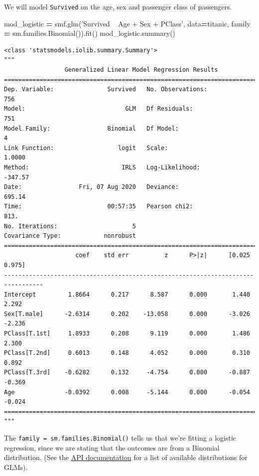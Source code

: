 \documentclass[
  letterpaper,
]{scrbook}
\newenvironment{Shaded}{\begin{snugshade}}{\end{snugshade}}
\newcommand{\NormalTok}[1]{#1}
\newcommand{\OperatorTok}[1]{\textcolor[rgb]{0.81,0.36,0.00}{\textbf{#1}}}
\newcommand{\StringTok}[1]{\textcolor[rgb]{0.31,0.60,0.02}{#1}}
\begin{document}
We will model \texttt{Survived} on the age, sex and passenger class of passengers.

\begin{Shaded}
\begin{Highlighting}[]
\NormalTok{mod_logistic }\OperatorTok{=}\NormalTok{ smf.glm(}\StringTok{'Survived ~ Age + Sex + PClass'}\NormalTok{, data}\OperatorTok{=}\NormalTok{titanic,}
\NormalTok{  family }\OperatorTok{=}\NormalTok{ sm.families.Binomial()).fit()}
\NormalTok{mod_logistic.summary()}
\end{Highlighting}
\end{Shaded}

\begin{verbatim}
<class 'statsmodels.iolib.summary.Summary'>
"""
                 Generalized Linear Model Regression Results                  
==============================================================================
Dep. Variable:               Survived   No. Observations:                  756
Model:                            GLM   Df Residuals:                      751
Model Family:                Binomial   Df Model:                            4
Link Function:                  logit   Scale:                          1.0000
Method:                          IRLS   Log-Likelihood:                -347.57
Date:                Fri, 07 Aug 2020   Deviance:                       695.14
Time:                        00:57:35   Pearson chi2:                     813.
No. Iterations:                     5                                         
Covariance Type:            nonrobust                                         
=================================================================================
                    coef    std err          z      P>|z|      [0.025      0.975]
---------------------------------------------------------------------------------
Intercept         1.8664      0.217      8.587      0.000       1.440       2.292
Sex[T.male]      -2.6314      0.202    -13.058      0.000      -3.026      -2.236
PClass[T.1st]     1.8933      0.208      9.119      0.000       1.486       2.300
PClass[T.2nd]     0.6013      0.148      4.052      0.000       0.310       0.892
PClass[T.3rd]    -0.6282      0.132     -4.754      0.000      -0.887      -0.369
Age              -0.0392      0.008     -5.144      0.000      -0.054      -0.024
=================================================================================
"""
\end{verbatim}

The \texttt{family\ =\ sm.families.Binomial()} tells us that we're fitting a logistic
regression, since we are stating that the outcomes are from a Binomial distribution. (See the \href{https://www.statsmodels.org/stable/glm.html\#families}{API documentation} for a list of available distributions for GLMs).
\end{document}
